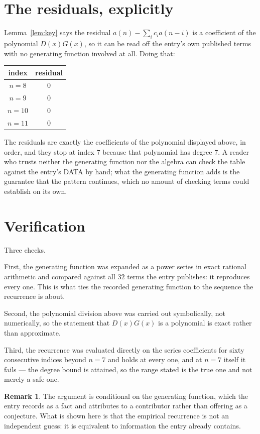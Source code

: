 \documentclass[11pt,a4paper]{article}
\theoremstyle{plain}
\theoremstyle{definition}
\newtheorem{remark}[theorem]{Remark}
\begin{document}
\section{The residuals, explicitly}

Lemma~\ref{lem:key} says the residual $a(n)-\sum_ic_ia(n-i)$ is a coefficient of the
polynomial $D(x)G(x)$, so it can be read off the entry's own published terms with no
generating function involved at all. Doing that:
\begin{center}
\begin{tabular}{cc}
index & residual \\ \hline
$n=8$ & $0$ \\
$n=9$ & $0$ \\
$n=10$ & $0$ \\
$n=11$ & $0$
\end{tabular}
\end{center}
The residuals are exactly the coefficients of the polynomial displayed above, in order, and
they stop at index $7$ because that polynomial has degree $7$. A reader who trusts
neither the generating function nor the algebra can check the table against the entry's DATA
by hand; what the generating function adds is the guarantee that the pattern continues, which
no amount of checking terms could establish on its own.

\section{Verification}

Three checks.

First, the generating function was expanded as a power series in exact rational arithmetic and
compared against all $32$ terms the entry publishes: it reproduces every one. This is
what ties the recorded generating function to the sequence the recurrence is about.

Second, the polynomial division above was carried out symbolically, not numerically, so the
statement that $D(x)G(x)$ is a polynomial is exact rather than approximate.

Third, the recurrence was evaluated directly on the series coefficients for sixty consecutive
indices beyond $n=7$ and holds at every one, and at $n=7$ itself it fails --- the
degree bound is attained, so the range stated is the true one and not merely a safe one.

\begin{remark}
The argument is conditional on the generating function, which the entry records as a fact and
attributes to a contributor rather than offering as a conjecture. What is shown here is that
the empirical recurrence is not an independent guess: it is equivalent to information the
entry already contains.
\end{remark}
\end{document}
